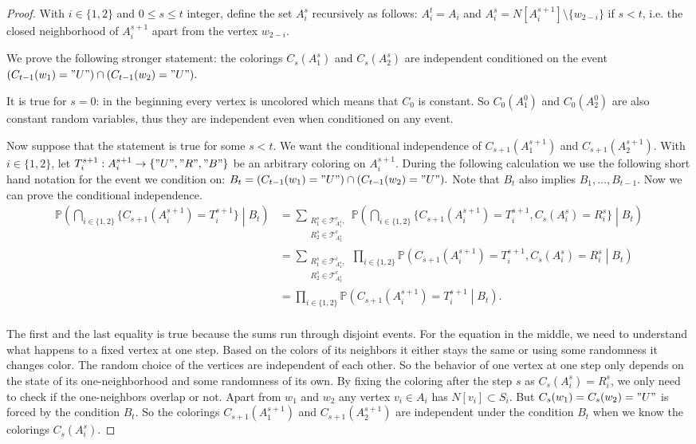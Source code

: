 \documentclass{article}
\theoremstyle{definition}
\newcommand{\bbP}{\mathbb P}
\begin{document}
\begin{proof}
 With $i\in\{1,2\}$ and $0\leq s\leq t$ integer, define the set $A_i^s$ recursively as follows: $A_i^t=A_i$ and $A_i^s=N[A_i^{s+1}]\setminus\{w_{2-i}\}$ if $s<t$, i.e. the closed neighborhood of $A^{s+1}_i$ apart from the vertex $w_{2-i}$.

We prove the following stronger statement: the colorings $C_s(A_1^s)$ and $C_s(A_2^s)$ are independent conditioned on the event $(C_{t-1}(w_1)="U")\cap(C_{t-1}(w_2)="U").$
    
 It is true for $s=0$: in the beginning every vertex is uncolored which means that $C_0$ is constant. So $C_0(A_1^0)$ and $C_0(A_2^0)$ are also constant random variables, thus they are independent even when conditioned on any event.
    
 Now suppose that the statement is true for some $s<t$. We want the conditional independence of $C_{s+1}(A_1^{s+1})$ and $C_{s+1}(A_2^{s+1})$. With $i\in\{1,2\}$, let $T_i^{s+1}:A_i^{s+1}\to\{"U","R","B"\}$ be an arbitrary coloring on $A_i^{s+1}$. During the following calculation we use the following short hand notation for the event we condition on: $B_t=(C_{t-1}(w_1)="U")\cap(C_{t-1}(w_2)="U").$ Note that $B_t$ also implies $B_1,\dots,B_{t-1}.$ Now we can prove the conditional independence.
\begin{equation*}
\begin{split}
 \bbP\left(\bigcap_{i\in\{1,2\}}\{C_{s+1}(A_i^{s+1})=T_i^{s+1}\}\middle|B_t\right)&=\sum_{\substack{R^s_1\in\mathcal T^c_{A_1^s},\\R^s_2\in\mathcal T^c_{A_2^s}}}\bbP\left(\bigcap_{i\in\{1,2\}}\{C_{s+1}(A_i^{s+1})=T_i^{s+1},C_s(A_i^s)=R_i^s\}\middle| B_t\right)\\
 &=\sum_{\substack{R^s_1\in\mathcal T^c_{A_1^s},\\R^s_2\in\mathcal T^c_{A_2^s}}}\prod_{i\in\{1,2\}} \bbP\left(C_{s+1}(A_i^{s+1})=T_i^{s+1},C_s(A_i^s)=R_i^s\middle| B_t\right)\\
 &=\prod_{i\in\{1,2\}} \bbP\left(C_{s+1}(A_i^{s+1})=T_i^{s+1}\middle| B_t\right).\\
\end{split}
\end{equation*}

The first and the last equality is true because the sums run through disjoint events. For the equation in the middle, we need to understand what happens to a fixed vertex at one step. Based on the colors of its neighbors it either stays the same or using some randomness it changes color. The random choice of the vertices are independent of each other. So the behavior of one vertex at one step only depends on the state of its one-neighborhood and some randomness of its own. By fixing the coloring after the step $s$ as $C_s(A_i^s)=R_i^s$, we only need to check if the one-neighbors overlap or not. Apart from $w_1$ and $w_2$ any vertex $v_i\in A_i$ has $N[v_i]\subset S_i$. But $C_{s}(w_1)=C_{s}(w_2)="U"$ is forced by the condition $B_t$. So the colorings $C_{s+1}(A_1^{s+1})$ and $C_{s+1}(A_2^{s+1})$ are independent under the condition $B_t$ when we know the colorings $C_s(A_i^s)$.
\end{proof}
\end{document}
